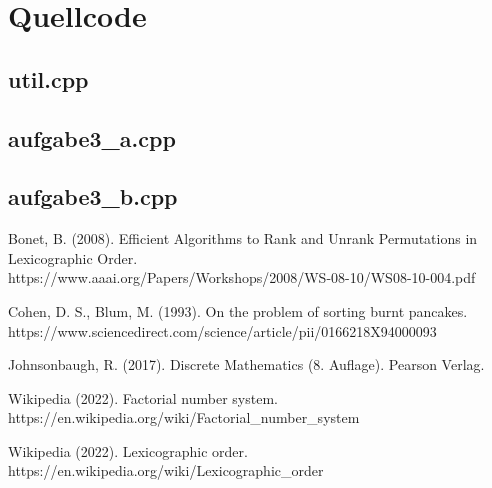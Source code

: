 \documentclass[a4paper, 11pt, ngerman]{article}
\begin{document}
\section{Quellcode}

\subsection{util.cpp}

\subsection{aufgabe3\_a.cpp}

\subsection{aufgabe3\_b.cpp}

\begin{thebibliography}{5}
    Bonet, B. (2008).
    Efficient Algorithms to Rank and Unrank Permutations in Lexicographic Order. \\
    https://www.aaai.org/Papers/Workshops/2008/WS-08-10/WS08-10-004.pdf

    Cohen, D. S., Blum, M. (1993).
    On the problem of sorting burnt pancakes. \\
    https://www.sciencedirect.com/science/article/pii/0166218X94000093

    Johnsonbaugh, R. (2017).
    Discrete Mathematics (8. Auflage).
    Pearson Verlag.

    Wikipedia (2022).
    Factorial number system. \\
    https://en.wikipedia.org/wiki/Factorial\_number\_system

    Wikipedia (2022).
    Lexicographic order. \\
    https://en.wikipedia.org/wiki/Lexicographic\_order
\end{thebibliography}
\end{document}
